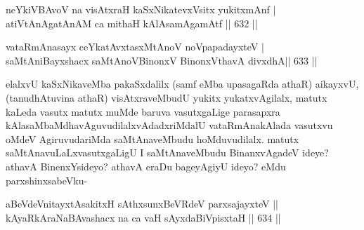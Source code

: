 \begin{shl}
\footnotemark[1]neYkiVBAvoV na visAtxraH kaSxNikatevxV\s sitx yukitxmAnf | \\
atiVtAnAgatAnAM ca mithaH kAlAsamAgamAtf \hfill||  632 ||  
\end{shl}
				
\begin{shl}
vataRmAnasayx ceYkatAvxtasxMtAnoV noVpapadayxteV | \\
saMtAniBayxshacx saMtAnoV\s BinonxV BinonxV\s thavA divxdhA\hfill ||  633 ||  
\end{shl}

\begin{artha}
elalxvU kaSxNikaveMba pakaSxdalilx (samf eMba upasagaRda athaR) aikayxvU, (tanudhAtuvina athaR) visAtxraveMbudU yukitx yukatxvAgilalx, matutx kaLeda vasutx matutx muMde baruva vasutxgaLige parasapxra kAlasaMbaMdhavAguvudilalxvAdadxriMdalU vataRmAnakAlada vasutxvu oMdeV AgiruvudariMda saMtAnaveMbudu hoMduvudilalx. matutx saMtAnavuLaLxvasutxgaLigU I saMtAnaveMbudu BinanxvAgadeV ideye? athavA BinenxYsideyo? athavA eraDu bageyAgiyU ideyo? eMdu parxshinxsabeVku-
\end{artha}


\begin{shl}
aBeVdeV\s nitayxtAsakitxH sAthxsunxBeVRdeV parxsajayxteV ||  \\
kAyaRkAraNaBAvashacx na ca vaH sAyxdaBiVpisxtaH \hfill||  634 ||  
\end{shl}

